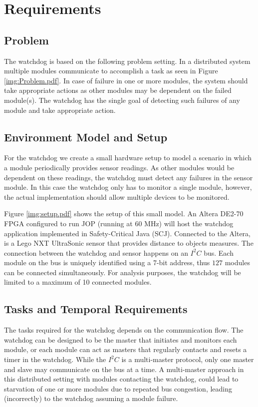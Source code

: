 \chapter{Requirements}
\section{Problem}
The watchdog is based on the following problem setting. In a distributed system multiple modules communicate to accomplish a task as seen in Figure \ref{img:Problem.pdf}. In case of failure in one or more modules, the system should take appropriate actions as other modules may be dependent on the failed module(s). The watchdog has the single goal of detecting such failures of any module and take appropriate action.

\section{Environment Model and Setup}
For the watchdog we create a small hardware setup to model a scenario in which a module periodically provides sensor readings. As other modules would be dependent on these readings, the watchdog must detect any failures in the sensor module. In this case the watchdog only has to monitor a single module, however, the actual implementation should allow multiple devices to be monitored.

Figure \ref{img:setup.pdf} shows the setup of this small model. An Altera DE2-70 FPGA configured to run JOP (running at 60 MHz) will host the watchdog application implemented in Safety-Critical Java (SCJ). Connected to the Altera, is a Lego NXT UltraSonic sensor that provides distance to objects measures. The connection between the watchdog and sensor happens on an $\textit{I}^2\textit{C}$ bus. Each module on the bus is uniquely identified using a 7-bit address, thus $127$ modules can be connected simultaneously. For analysis purposes, the watchdog will be limited to a maximum of 10 connected modules.

\section{Tasks and Temporal Requirements}
The tasks required for the watchdog depends on the communication flow. The watchdog can be designed to be the master that initiates and monitors each module, or each module can act as masters that regularly contacts and resets a timer in the watchdog. While the $\textit{I}^2\textit{C}$ is a multi-master protocol, only one master and slave may communicate on the bus at a time.
A multi-master approach in this distributed setting with modules contacting the watchdog, could lead to starvation of one or more modules due to repeated bus congestion, leading (incorrectly) to the watchdog assuming a module failure.

